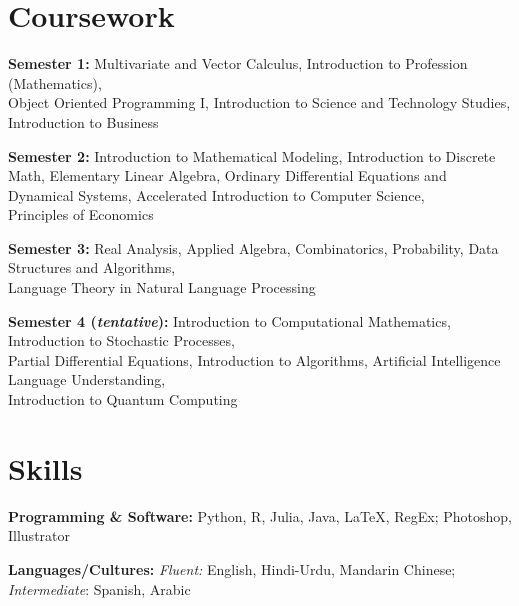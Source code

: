 \documentclass[letterpaper,11pt]{article}
\newcommand{\resumeSubHeadingListStart}{\begin{itemize}[leftmargin=0.15in, label={}]}
\newcommand{\resumeSubHeadingListEnd}{\end{itemize}}
\begin{document}
\section{Coursework}
  \vspace{2pt}
  \resumeSubHeadingListStart
    \small{\item{
        \textbf{Semester 1:}{ Multivariate and Vector Calculus, Introduction to Profession (Mathematics),\\Object Oriented Programming I, Introduction to Science and Technology Studies, Introduction to Business}
        
        \textbf{Semester 2:}{ Introduction to Mathematical Modeling, Introduction to Discrete Math, Elementary Linear Algebra, Ordinary Differential Equations and Dynamical Systems, Accelerated Introduction to Computer Science,\\Principles of Economics}

        \textbf{Semester 3:}{ Real Analysis, Applied Algebra, Combinatorics, Probability, Data Structures and Algorithms,\\Language Theory in Natural Language Processing}

        \textbf{Semester 4 (\textit{tentative}):}{ Introduction to Computational Mathematics, Introduction to Stochastic Processes,\\Partial Differential Equations, Introduction to Algorithms, Artificial Intelligence Language Understanding,\\Introduction to Quantum Computing}
    }}
  \resumeSubHeadingListEnd


\section{Skills}
  \vspace{2pt}
  \resumeSubHeadingListStart
    \small{\item{
        \textbf{Programming \& Software:}{ Python, R, Julia, Java, \LaTeX, RegEx; Photoshop, Illustrator} \\ \vspace{3pt}
        
        \textbf{Languages/Cultures:}{ \textit{Fluent:} English, Hindi-Urdu, Mandarin Chinese; \textit{Intermediate}: Spanish, Arabic}
        
    }}
  \resumeSubHeadingListEnd
\end{document}
